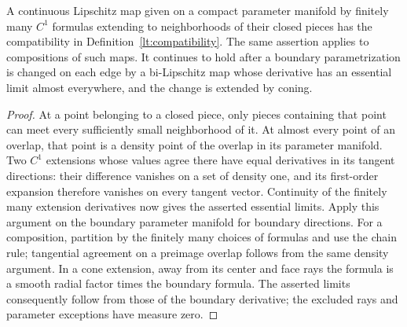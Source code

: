 \begin{lemma}
\label{lt:closed-pieces}
A continuous Lipschitz map given on a compact parameter manifold by
finitely many $C^1$ formulas extending to neighborhoods of their closed
pieces has the compatibility in Definition~\ref{lt:compatibility}.
The same assertion applies to compositions of such maps.  It continues
to hold after a boundary parametrization is changed on each edge by a
bi-Lipschitz map whose derivative has an essential limit almost
everywhere, and the change is extended by coning.
\end{lemma}

\begin{proof}
At a point belonging to a closed piece, only pieces containing that
point can meet every sufficiently small neighborhood of it.  At almost
every point of an overlap, that point is a density point of the overlap
in its parameter manifold.  Two $C^1$ extensions whose values agree
there have equal derivatives in its tangent directions: their difference
vanishes on a set of density one, and its first-order expansion therefore
vanishes on every tangent vector.  Continuity of the finitely many
extension derivatives now gives the asserted essential limits.
Apply this argument on the boundary parameter manifold for boundary
directions.  For a composition, partition by the finitely many choices
of formulas and use the chain rule; tangential agreement on a preimage
overlap follows from the same density argument.  In a cone extension,
away from its center and face rays the formula is a smooth radial
factor times the boundary formula.  The asserted limits consequently
follow from those of the boundary derivative; the excluded rays and
parameter exceptions have measure zero.
\end{proof}

